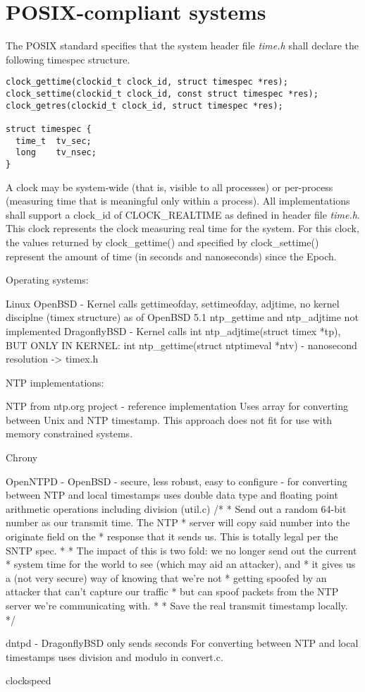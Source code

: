 
\section{POSIX-compliant systems}\label{sec:others-posix}
The POSIX standard specifies that
the system header file {\it{time.h}} shall declare the following timespec structure.
\begin{lstlisting}[morekeywords={clockid_t,time_t}]
clock_gettime(clockid_t clock_id, struct timespec *res);
clock_settime(clockid_t clock_id, const struct timespec *res);
clock_getres(clockid_t clock_id, struct timespec *res);

struct timespec {
  time_t  tv_sec;
  long    tv_nsec;
}
\end{lstlisting}
A clock may be system-wide (that is, visible to all processes)
or per-process (measuring time that is meaningful only within a process).
All implementations shall support a clock\_id of CLOCK\_REALTIME as
defined in header file {\it{time.h}}.
This clock represents the clock measuring real time for the system.
For this clock, the values returned by clock\_gettime() and specified
by clock\_settime() represent the amount
of time (in seconds and nanoseconds) since the Epoch.


Operating systems:

Linux
OpenBSD - Kernel calls gettimeofday, settimeofday, adjtime, no kernel disciplne (timex structure)
as of OpenBSD 5.1 ntp\_gettime and ntp\_adjtime not implemented
DragonflyBSD - Kernel calls int ntp\_adjtime(struct timex *tp),
BUT ONLY IN KERNEL: int ntp\_gettime(struct ntptimeval *ntv) - nanosecond resolution -> timex.h

NTP implementations:

NTP from ntp.org project - reference implementation
Uses array for converting between Unix and NTP timestamp.
This approach does not fit for use with memory constrained systems.

Chrony

OpenNTPD - OpenBSD - secure, less robust, easy to configure - for converting between NTP and local timestamps uses double
data type and floating point arithmetic operations including division (util.c)
	/*
	 * Send out a random 64-bit number as our transmit time.  The NTP
	 * server will copy said number into the originate field on the
	 * response that it sends us.  This is totally legal per the SNTP spec.
	 *
	 * The impact of this is two fold: we no longer send out the current
	 * system time for the world to see (which may aid an attacker), and
	 * it gives us a (not very secure) way of knowing that we're not
	 * getting spoofed by an attacker that can't capture our traffic
	 * but can spoof packets from the NTP server we're communicating with.
	 *
	 * Save the real transmit timestamp locally.
	 */

dntpd - DragonflyBSD
only sends seconds
For converting between NTP and local timestamps uses division and modulo in convert.c.


clockspeed
